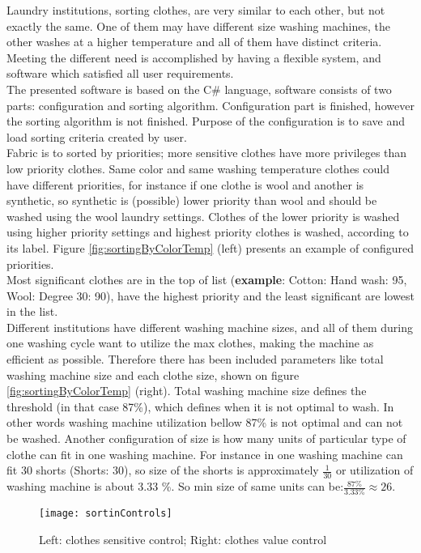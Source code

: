 Laundry institutions, sorting clothes, are very similar to each other, but not exactly the same. One of them may have different size washing machines, the other washes at a higher temperature and all of them have distinct criteria.  Meeting the different need is accomplished by having a flexible system, and software which satisfied all user requirements. \\  The presented software is based on the C\# language, software consists of two parts: configuration and sorting algorithm. Configuration part is finished, however the sorting algorithm is not finished. Purpose of the configuration is to save and load sorting criteria created by user. 
\\
Fabric is to sorted by priorities; more sensitive clothes have more privileges than low priority clothes. Same color and same washing temperature clothes could have different priorities, for instance if one clothe is wool and another is synthetic, so synthetic is (possible) lower priority than wool and should be washed using the wool laundry settings. Clothes of the lower priority is washed using higher priority settings and highest priority clothes is washed, according to its label. Figure \ref{fig:sortingByColorTemp} (left) presents an example of configured priorities. \\ Most significant clothes are in the top of list (\textbf{example}: Cotton: Hand wash: 95, Wool: Degree 30: 90),  have the highest priority and the least significant are lowest in the list. 
\\
Different institutions have different washing machine sizes, and all of them during one washing cycle want to utilize the max clothes, making the machine as efficient as possible. Therefore there has been included parameters like total washing machine size and each clothe size, shown on figure \ref{fig:sortingByColorTemp} (right). Total washing machine size defines the threshold (in that case 87\%), which defines when it is not optimal to wash. In other words washing machine utilization bellow 87\% is not optimal and can not be washed. Another configuration of size is how many units of particular type of clothe can fit in one washing machine. For instance in one washing machine can fit 30 shorts (Shorts: 30), so size of the shorts is approximately $\frac{1}{30}$ or utilization of washing machine is about 3.33 \%. So min size of same units can be:$\frac{87\%}{3.33\%}\approx 26$. \\

\begin{figure}[h]
	\centering
		\texttt{[image: sortinControls]}
	\caption{Left: clothes sensitive control; Right: clothes value control}
	\label{fig:sortinControls}
\end{figure}

